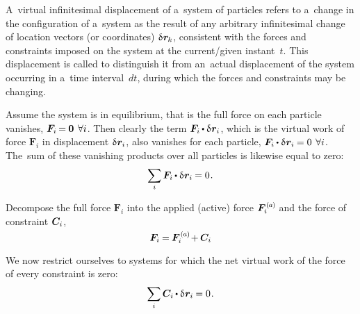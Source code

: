 A~virtual infinitesimal displacement of a~system of particles refers to a~change in the configuration of a~system as the result of any arbitrary infinitesimal change of location vectors (or coordinates) ${\variation{\hspace{.1ex}\locationvector_{\hspace{-0.1ex}k}}}$, consistent with the forces and constraints imposed on the system at the current/given instant~$t$.
This displacement is called  to distinguish it from an~actual displacement of the system occurring in a~time interval~${dt}$, during which the forces and constraints may be changing.

Assume the system is in equilibrium, that is the full force on each particle vanishes, ${\bm{F}_i \hspace{-0.2ex} = \hspace{-0.1ex} {\bm{0}} \hspace{.4em} \forall i}$.
Then clearly the term ${\bm{F}_i \hspace{-0.1ex} \dotp \variation{\hspace{.1ex}\locationvector_i}}$, which is the virtual work of force ${\bm{F}_i}$ in displacement ${\variation{\hspace{.1ex}\locationvector_i}}$, also vanishes for each particle, ${\bm{F}_i \hspace{-0.1ex} \dotp \variation{\hspace{.1ex}\locationvector_i} \hspace{-0.1ex} = 0 \hspace{.4em} \forall i}$.
The~sum of these vanishing products over all particles is likewise equal to zero:
\[
\displaystyle\sum_{\smash{i}} \bm{F}_i \hspace{-0.1ex} \dotp \variation{\hspace{.1ex}\locationvector_i} \hspace{-0.1ex} = 0
\hspace{.15ex} .
\]

Decompose
the full force ${\bm{F}_i}$
into the applied (active) force $\activeforcewithindex{i}$
and the force of constraint $\bm{C}_{i}$,
\[
\bm{F}_i \hspace{-0.1ex} = \hspace{-0.1ex} \activeforcewithindex{i} \hspace{-0.2ex} + \hspace{-0.1ex} \constraintforcewithindex{i}
\]

We now restrict ourselves to systems for which the net virtual work of the force of every constraint is zero:
\[
\displaystyle\sum_{\smash{i}} \constraintforcewithindex{i} \hspace{-0.1ex} \dotp \variation{\hspace{.1ex}\locationvector_i} \hspace{-0.1ex} = 0
\hspace{.15ex} .
\]

